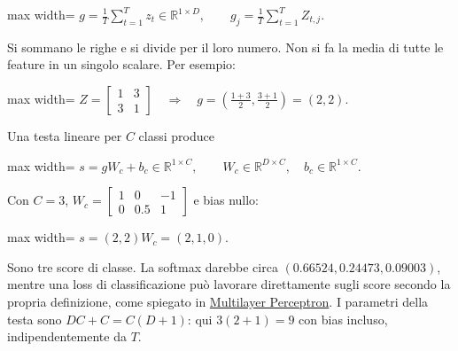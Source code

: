 \documentclass[11pt,a4paper,oneside,openany]{book}
\begin{document}
\begin{center}
\begin{adjustbox}{max width=\linewidth}
$\displaystyle \boxed{g=\frac1T\sum_{t=1}^{T}z_t\in\mathbb R^{1\times D},\qquad
g_j=\frac1T\sum_{t=1}^{T}Z_{t,j}.}$
\end{adjustbox}
\end{center}

Si sommano le righe e si divide per il loro numero. Non si fa la media di tutte le feature in un singolo scalare. Per esempio:

\begin{center}
\begin{adjustbox}{max width=\linewidth}
$\displaystyle Z=\begin{bmatrix}1&3\\3&1\end{bmatrix}
\quad\Longrightarrow\quad
g=\left(\frac{1+3}2,\frac{3+1}2\right)=(2,2).$
\end{adjustbox}
\end{center}

Una testa lineare per \(C\) classi produce

\begin{center}
\begin{adjustbox}{max width=\linewidth}
$\displaystyle \boxed{s=gW_c+b_c\in\mathbb R^{1\times C},\qquad W_c\in\mathbb R^{D\times C},\quad b_c\in\mathbb R^{1\times C}.}$
\end{adjustbox}
\end{center}

Con \(C=3\), \(W_c=\begin{bmatrix}1&0&-1\\0&0.5&1\end{bmatrix}\) e bias nullo:

\begin{center}
\begin{adjustbox}{max width=\linewidth}
$\displaystyle s=(2,2)W_c=(2,1,0).$
\end{adjustbox}
\end{center}

Sono tre score di classe. La softmax darebbe circa \((0.66524,0.24473,0.09003)\), mentre una loss di classificazione può lavorare direttamente sugli score secondo la propria definizione, come spiegato in \hyperref[fonte01]{Multilayer Perceptron}. I parametri della testa sono \(DC+C=C(D+1)\): qui \(3(2+1)=9\) con bias incluso, indipendentemente da \(T\).
\end{document}
